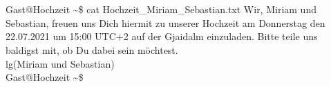 \documentclass[12pt, a5paper]{article}
\begin{document}
\noindent
\begin{figure}
\end{figure}
\\ \\ \\ \\ \\ \\ \\ \\ \\ \\ \\ \\ 
{\selectfont
\lbrack Gast@Hochzeit \textasciitilde\rbrack\$ cat Hochzeit\_Miriam\_Sebastian.txt
Wir, Miriam und Sebastian, freuen uns Dich hiermit zu unserer Hochzeit am Donnerstag den 22.07.2021 um 15:00 UTC+2 auf der Gjaidalm einzuladen. Bitte teile uns baldigst mit, ob Du dabei sein möchtest.\\ lg(Miriam und Sebastian) \\
\lbrack Gast@Hochzeit \textasciitilde\rbrack\$\\
}
\end{document}
